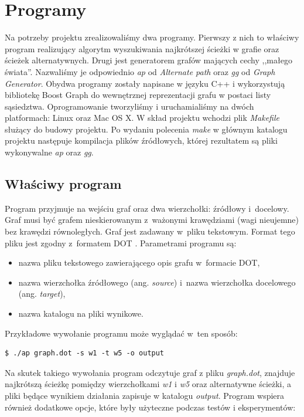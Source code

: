 \documentclass[a4paper, 12pt]{article}
\begin{document}
\section{Programy}

Na potrzeby projektu zrealizowaliśmy dwa programy. Pierwszy z nich to właściwy program realizujący algorytm wyszukiwania najkrótszej ścieżki w grafie oraz ścieżek alternatywnych. Drugi jest generatorem grafów mających cechy ,,małego świata''. Nazwaliśmy je odpowiednio {\it ap} od {\it Alternate path} oraz {\it gg} od {\it Graph Generator}. Obydwa programy zostały napisane w języku C++ i wykorzystują bibliotekę Boost Graph \cite{bgl} do wewnętrznej reprezentacji grafu w postaci listy sąsiedztwa. Oprogramowanie tworzyliśmy i uruchamialiśmy na dwóch platformach: Linux oraz Mac OS X. W skład projektu wchodzi plik {\it Makefile} służący do budowy projektu. Po wydaniu polecenia {\it make} w głównym katalogu projektu następuje kompilacja plików źródłowych, której rezultatem są pliki wykonywalne {\it ap} oraz {\it gg}.

\subsection{Właściwy program}

Program przyjmuje na wejściu graf oraz dwa wierzchołki: źródłowy i~docelowy. Graf musi być grafem nieskierowanym z~ważonymi krawędziami (wagi nieujemne) bez krawędzi równoległych. Graf jest zadawany w~pliku tekstowym. Format tego pliku jest zgodny z~formatem DOT \cite{dot}. Parametrami programu są:

\begin{itemize}
\item nazwa pliku tekstowego zawierającego opis grafu w~formacie DOT,
\item nazwa wierzchołka źródłowego (ang. {\it source}) i~nazwa wierzchołka docelowego (ang. {\it target}),
\item nazwa katalogu na pliki wynikowe.
\end{itemize}

Przykładowe wywołanie programu może wyglądać w~ten sposób:

\begin{verbatim}
$ ./ap graph.dot -s w1 -t w5 -o output
\end{verbatim}

Na skutek takiego wywołania program odczytuje graf z pliku {\it graph.dot}, znajduje najkrótszą ścieżkę pomiędzy wierzchołkami {\it w1} i {\it w5} oraz alternatywne ścieżki, a pliki będące wynikiem działania zapisuje w katalogu {\it output}. Program wspiera również dodatkowe opcje, które były użyteczne podczas testów i eksperymentów:
\end{document}
